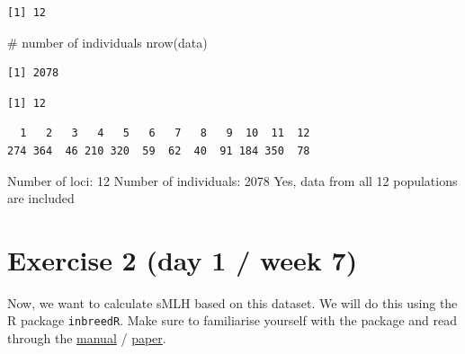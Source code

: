 \documentclass[
  letterpaper,
  DIV=11,
  numbers=noendperiod]{scrreprt}
\newenvironment{Shaded}{}{}
\newcommand{\CommentTok}[1]{\textcolor[rgb]{0.42,0.45,0.49}{#1}}
\newcommand{\FunctionTok}[1]{\textcolor[rgb]{0.44,0.26,0.76}{#1}}
\newcommand{\NormalTok}[1]{\textcolor[rgb]{0.14,0.16,0.18}{#1}}
\newcommand{\SpecialCharTok}[1]{\textcolor[rgb]{0.00,0.36,0.77}{#1}}
\begin{document}
\begin{tcolorbox}
\begin{verbatim}
[1] 12
\end{verbatim}

\begin{Shaded}
\begin{Highlighting}[]
\CommentTok{\# number of individuals}
\FunctionTok{nrow}\NormalTok{(data)}
\end{Highlighting}
\end{Shaded}

\begin{verbatim}
[1] 2078
\end{verbatim}

\begin{Shaded}
\end{Shaded}

\begin{verbatim}
[1] 12
\end{verbatim}

\begin{Shaded}
\end{Shaded}

\begin{verbatim}
  1   2   3   4   5   6   7   8   9  10  11  12 
274 364  46 210 320  59  62  40  91 184 350  78 
\end{verbatim}

Number of loci: 12 Number of individuals: 2078 Yes, data from all 12
populations are included

\end{tcolorbox}

\section{Exercise 2 (day 1 / week 7)}\label{exercise-2-day-1-week-7}

Now, we want to calculate sMLH based on this dataset. We will do this
using the R package \texttt{inbreedR}. Make sure to familiarise yourself
with the package and read through the
\href{https://cran.r-project.org/web/packages/inbreedR/vignettes/inbreedR_step_by_step.html}{manual}
/
\href{https://besjournals.onlinelibrary.wiley.com/doi/full/10.1111/2041-210X.12588}{paper}.
\end{document}
